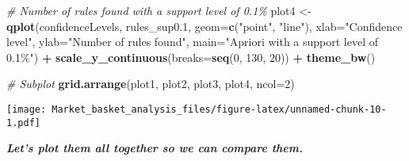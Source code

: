 \documentclass[
]{article}
\newenvironment{Shaded}{\begin{snugshade}}{\end{snugshade}}
\newcommand{\AttributeTok}[1]{\textcolor[rgb]{0.13,0.29,0.53}{#1}}
\newcommand{\CommentTok}[1]{\textcolor[rgb]{0.56,0.35,0.01}{\textit{#1}}}
\newcommand{\DecValTok}[1]{\textcolor[rgb]{0.00,0.00,0.81}{#1}}
\newcommand{\FloatTok}[1]{\textcolor[rgb]{0.00,0.00,0.81}{#1}}
\newcommand{\FunctionTok}[1]{\textcolor[rgb]{0.13,0.29,0.53}{\textbf{#1}}}
\newcommand{\NormalTok}[1]{#1}
\newcommand{\OtherTok}[1]{\textcolor[rgb]{0.56,0.35,0.01}{#1}}
\newcommand{\SpecialCharTok}[1]{\textcolor[rgb]{0.81,0.36,0.00}{\textbf{#1}}}
\newcommand{\StringTok}[1]{\textcolor[rgb]{0.31,0.60,0.02}{#1}}
\begin{document}
\begin{Shaded}
\begin{Highlighting}[]
\CommentTok{\# Number of rules found with a support level of 0.1\%}
\NormalTok{plot4 }\OtherTok{\textless{}{-}} \FunctionTok{qplot}\NormalTok{(confidenceLevels, rules\_sup0}\FloatTok{.1}\NormalTok{, }\AttributeTok{geom=}\FunctionTok{c}\NormalTok{(}\StringTok{"point"}\NormalTok{, }\StringTok{"line"}\NormalTok{), }
               \AttributeTok{xlab=}\StringTok{"Confidence level"}\NormalTok{, }\AttributeTok{ylab=}\StringTok{"Number of rules found"}\NormalTok{, }
               \AttributeTok{main=}\StringTok{"Apriori with a support level of 0.1\%"}\NormalTok{) }\SpecialCharTok{+} 
  \FunctionTok{scale\_y\_continuous}\NormalTok{(}\AttributeTok{breaks=}\FunctionTok{seq}\NormalTok{(}\DecValTok{0}\NormalTok{, }\DecValTok{130}\NormalTok{, }\DecValTok{20}\NormalTok{)) }\SpecialCharTok{+}
  \FunctionTok{theme\_bw}\NormalTok{()}

\CommentTok{\# Subplot}
\FunctionTok{grid.arrange}\NormalTok{(plot1, plot2, plot3, plot4, }\AttributeTok{ncol=}\DecValTok{2}\NormalTok{)}
\end{Highlighting}
\end{Shaded}

\texttt{[image: Market\_basket\_analysis\_files/figure-latex/unnamed-chunk-10-1.pdf]}

\textbf{\emph{Let's plot them all together so we can compare them.}}
\end{document}
